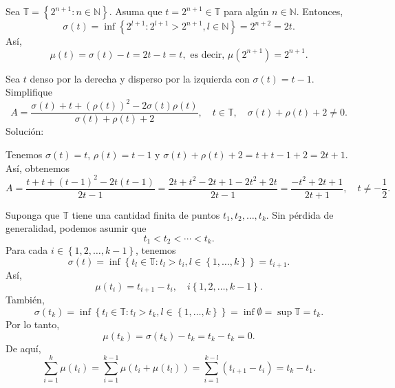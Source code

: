 \begin{frame}
\begin{example}
Sea $\mathds{T}=\left\{2^{n+1}:n\in\mathds{N}\right\}$. Asuma que $t=2^{n+1}\in\mathds{T}$ para algún $n\in\mathds{N}$. Entonces,  \[ \sigma\left(t\right)=\inf\left\{2^{l+1}:2^{l+1}>2^{n+1}, l\in\mathds{N}\right\}=2^{n+2}=2t. \] Así, \[ \mu\left(t\right)=\sigma\left(t\right)-t=2t-t=t,\text{ es decir, }\mu\left(2^{n+1}\right)=2^{n+1}. \]
\end{example}

\begin{example}
Sea $t$ denso por la derecha y disperso por la izquierda con $\sigma\left(t\right)=t-1$. Simplifique \[ A=\frac{\sigma\left(t\right)+t+{\left(\rho\left(t\right)\right)}^{2}-2\sigma\left(t\right)\rho\left(t\right)}{\sigma\left(t\right)+\rho\left(t\right)+2},\quad t\in\mathds{T},\quad\sigma\left(t\right)+\rho\left(t\right)+2\neq0. \]
\alert{Solución:}

Tenemos  $\sigma\left(t\right)=t$, $\rho\left(t\right)=t-1$ y $\sigma\left(t\right)+\rho\left(t\right)+2=t+t-1+2=2t+1$. Así, obtenemos \[ A=\frac{t+t+{\left(t-1\right)}^{2}-2t\left(t-1\right)}{2t-1}=\frac{2t+t^{2}-2t+1-2t^{2}+2t}{2t-1}=\frac{-t^{2}+2t+1}{2t+1},\quad t\neq-\frac{1}{2}. \]
\end{example}
\end{frame}

\begin{frame}
\begin{example}
Suponga que $\mathds{T}$ tiene una cantidad finita de puntos $t_{1},t_{2},\ldots,t_{k}$. Sin pérdida de generalidad, podemos asumir que \[ t_{1}<t_{2}<\cdots<t_{k}. \] Para cada $i\in\left\{1,2,\ldots,k-1\right\}$, tenemos \[ \sigma\left(t\right)=\inf\left\{t_{l}\in\mathds{T}:t_{l}>t_{i},l\in\left\{1,\ldots,k\right\}\right\}=t_{i+1}. \] Así, \[ \mu\left(t_{i}\right)=t_{i+1}-t_{i},\quad i\left\{1,2,\ldots,k-1\right\}. \] También, \[ \sigma\left(t_{k}\right)=\inf\left\{t_{l}\in\mathds{T}:t_{l}>t_{k},l\in\left\{1,\ldots,k\right\}\right\}=\inf\emptyset=\sup\mathds{T}=t_{k}. \] Por lo tanto, \[ \mu\left(t_{k}\right)=\sigma\left(t_{k}\right)-t_{k}=t_{k}-t_{k}=0. \] De aquí, \[ \sum_{i=1}^{k}\mu\left(t_{i}\right)=\sum_{i=1}^{k-1}\mu\left(t_{i}+\mu\left(t_{l}\right)\right)=\sum_{i=1}^{k-l}\left(t_{i+1}-t_{i}\right)=t_{k}-t_{1}. \]
\end{example}
\end{frame}

